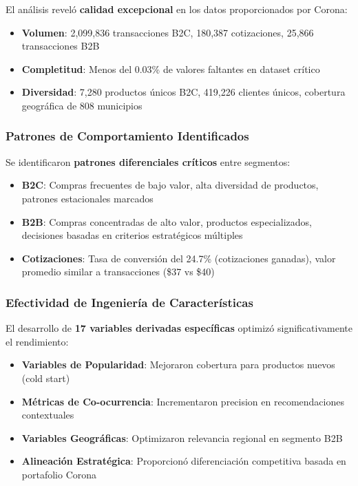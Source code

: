 \documentclass[twocolumn]{article}
\begin{document}
El análisis reveló \textbf{calidad excepcional} en los datos proporcionados por Corona:
\begin{itemize}
    \item \textbf{Volumen}: 2,099,836 transacciones B2C, 180,387 cotizaciones, 25,866 transacciones B2B
    \item \textbf{Completitud}: Menos del 0.03\% de valores faltantes en dataset crítico
    \item \textbf{Diversidad}: 7,280 productos únicos B2C, 419,226 clientes únicos, cobertura geográfica de 808 municipios
\end{itemize}

\subsubsection{Patrones de Comportamiento Identificados}

Se identificaron \textbf{patrones diferenciales críticos} entre segmentos:
\begin{itemize}
    \item \textbf{B2C}: Compras frecuentes de bajo valor, alta diversidad de productos, patrones estacionales marcados
    \item \textbf{B2B}: Compras concentradas de alto valor, productos especializados, decisiones basadas en criterios estratégicos múltiples
    \item \textbf{Cotizaciones}: Tasa de conversión del 24.7\% (cotizaciones ganadas), valor promedio similar a transacciones (\$37 vs \$40)
\end{itemize}

\subsubsection{Efectividad de Ingeniería de Características}

El desarrollo de \textbf{17 variables derivadas específicas} optimizó significativamente el rendimiento:
\begin{itemize}
    \item \textbf{Variables de Popularidad}: Mejoraron cobertura para productos nuevos (cold start)
    \item \textbf{Métricas de Co-ocurrencia}: Incrementaron precision en recomendaciones contextuales
    \item \textbf{Variables Geográficas}: Optimizaron relevancia regional en segmento B2B
    \item \textbf{Alineación Estratégica}: Proporcionó diferenciación competitiva basada en portafolio Corona
\end{itemize}
\end{document}
